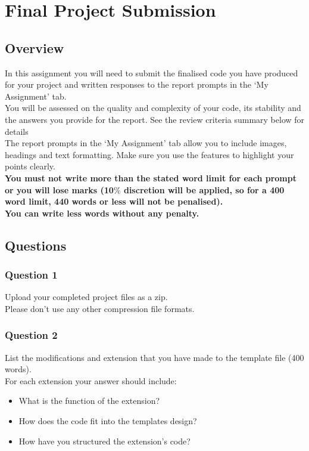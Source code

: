 \chapter*{Final Project Submission}

\section*{Overview}
In this assignment you will need to submit the finalised code you have produced for your project and written responses to the report prompts in the ‘My Assignment’ tab.\\
You will be assessed on the quality and complexity of your code, its stability and the answers you provide for the report. See the review criteria summary below for details\\
The report prompts in the ‘My Assignment’ tab allow you to include images, headings and text formatting. Make sure you use the features to highlight your points clearly.\\
\textbf{You must not write more than the stated word limit for each prompt or you will lose marks (10$\%$ discretion will be applied, so for a 400 word limit, 440 words or less will not be penalised).\\
You can write less words without any penalty. }

\section*{Questions}

\subsection*{Question 1}
Upload your completed project files as a zip.\\
Please don’t use any other compression file formats.

\subsection*{Question 2}
List the modifications and extension that you have made to the template file (400 words).\\
For each extension your answer should include:
\begin{itemize}
  \item What is the function of the extension?
  \item How does the code fit into the templates design?
  \item How have you structured the extension's code?
\end{itemize}

